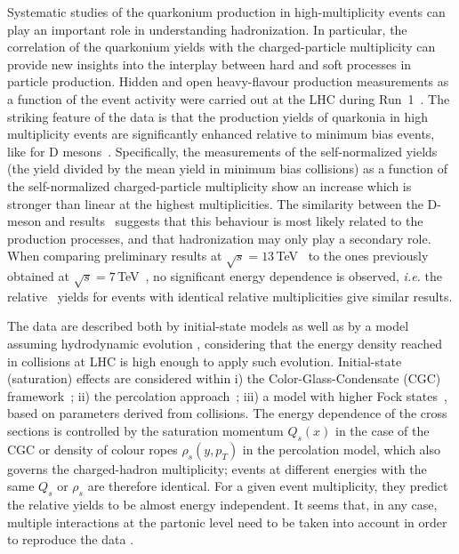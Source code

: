 \documentclass[../report.tex]{subfiles}
\begin{document}
Systematic studies of the quarkonium production in high-multiplicity \pp events can play an important role in understanding hadronization.
In particular, the correlation of the quarkonium yields with the charged-particle multiplicity can provide new insights into the interplay between hard and soft processes in particle production.
Hidden and open heavy-flavour production measurements as a function of the event activity were carried out  at the LHC during Run~1~\cite{Abelev:2012rz,Chatrchyan:2013nza}.
The striking feature of the data is that the production yields of quarkonia in high multiplicity events are significantly enhanced relative to minimum bias events, like for D mesons~\cite{Adam:2015ota}.
Specifically, the measurements of the self-normalized yields (the yield divided by the mean yield in minimum bias collisions) as a function of the self-normalized charged-particle multiplicity show an increase which is stronger than linear at the highest multiplicities.
The similarity between the D-meson and \PJgy results~\cite{Abelev:2012rz,Adam:2015ota} suggests that this behaviour is most likely related to the production processes, and that hadronization may only play a secondary role.
When comparing \PJgy preliminary results at $\sqrt{s}=13$\,TeV~\cite{Weber:2017hhm} to the ones previously obtained at $\sqrt{s} = 7$\,TeV~\cite{Abelev:2012rz}, no significant energy dependence is observed, {\it i.e.} the relative \PJgy~yields for events with identical relative multiplicities give similar results.

The data are described both by initial-state models as well as by a model assuming hydrodynamic evolution \cite{Werner:2013tya}, considering that the energy density reached in \pp collisions at LHC is high enough to apply such evolution.
Initial-state (saturation) effects are considered within
i) the Color-Glass-Condensate (CGC) framework~\cite{Ma:2018bax}; ii) the percolation approach~\cite{Ferreiro:2012fb,Ferreiro:2015gea}; iii) a model with higher Fock states~\cite{Kopeliovich:2013yfa}, based on parameters derived from \pPb collisions.
The energy dependence of the cross sections is controlled by the saturation momentum $Q_s(x)$ in the case of the CGC or density of colour ropes $\rho_s(y,p_T)$ in the percolation model, which also governs the charged-hadron multiplicity; events at different energies with the same $Q_s$ or $\rho_s$ are therefore identical.
For a given event multiplicity, they predict the relative yields to be almost energy independent.
It seems that, in any case, multiple interactions at the partonic level need to be taken into account in order to reproduce the data \cite{Sjostrand:2014zea,Skands:2014pea,Sjostrand:2017cdm}.
\end{document}
